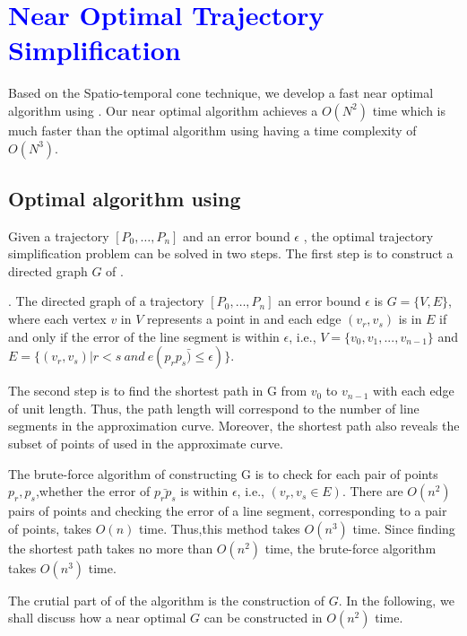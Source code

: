 \section{\textcolor{blue}{Near Optimal Trajectory Simplification}}
\label{sec-optimal}

Based on the Spatio-temporal cone technique, we develop a fast near optimal algorithm using \sed. Our near optimal algorithm achieves a $O(N^2)$ time which is much faster than the optimal algorithm using \sed having a time complexity of $O(N^3)$.


\subsection{Optimal algorithm using \sed}

Given a trajectory ${[P_0, \ldots, P_n]}$ and an error bound $\epsilon$ ,
the optimal trajectory simplification problem can be solved in two steps.
%
The first step is to construct a directed graph $G$ of . 

. The directed graph of a trajectory ${[P_0, \ldots, P_n]}$ \wrt an error bound $\epsilon$ is $G
= \{V,E\}$, where each vertex $v$ in $V$ represents a point in  and each edge $(v_r,v_s)$ is in $E$ if and only if the error of the line segment is within
$\epsilon$, i.e., $V= \{v_0,v_1,...,v_{n-1}\}$ and  $E = \{(v_r,v_s) | r < s \ and \ e(\bar{p_rp_s) \le \epsilon})\}$. 



The second step is to find the shortest path
in G from $v_0$ to $v_{n-1}$ with each edge of unit length. Thus, the path
length will correspond to the number of line segments in the approximation
curve. Moreover, the shortest path also reveals the subset of points of
 used in the approximate curve.


The brute-force algorithm of constructing G is to check for each pair of points
$p_r,p_s$,whether the error of $\bar{p_rp_s}$ is within $\epsilon$, i.e.,
$(v_r,v_s \in  E)$. There are $O(n^2)$ pairs of points and checking the error of
a line segment, corresponding to a pair of points, takes $O(n)$ time. Thus,this
method takes $O(n^3)$ time. Since finding the shortest path takes no more than
$O(n^2)$ time, the brute-force algorithm takes $O(n^3)$ time.

The crutial part of of the algorithm is the construction of $G$. 
In the following, we shall discuss how a near optimal $G$ can be constructed in $O(n^2)$ time.


